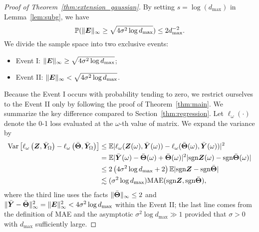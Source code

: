 \documentclass[11pt]{article}
\theoremstyle{plain}
\theoremstyle{definition}
\def\sign{\textup{sgn}}
\begin{document}
\begin{proof}[Proof of Theorem~\ref{thm:extension_gaussian}]
By setting $s=\log(d_{\max})$ in Lemma~\ref{lem:subg}, we have
\[
\mathbb{P}(\lVert\bm{E}\rVert_\infty\geq \sqrt{4\sigma^2\log d_{\max}} )\leq 2d_{\max}^{-2}.
\]
We divide the sample space into two exclusive events:
\begin{itemize}
\item Event I: $\lVert\bm{E}\rVert_\infty\geq \sqrt{4\sigma^2\log d_{\max}}$;
\item Event II: $\lVert\bm{E}\rVert_\infty< \sqrt{4\sigma^2\log d_{\max}}$.
\end{itemize}
Because the Event I occurs with probability tending to zero, we restrict ourselves to the Event II only by following the proof of Theorem~\ref{thm:main}.   We summarize the key difference compared to Section~\ref{thm:regression}. Let $\ell_\omega(\cdot)$ denote the 0-1 loss evaluated at the $\omega$-th value of matrix. 
We expand the variance by 
\begin{align}
    \label{eq:variance2}
    \text{Var}\left[\ell_\omega\left(\mZ,\bar \mY_\Omega\right)-\ell_\omega\left(\bar\mTheta,\bar\mY_\Omega\right)\right]&\leq \mathbb{E}|\ell_\omega(\mZ(\omega),\bar\mY(\omega))-\ell_\omega(\bar\mTheta(\omega),\bar\mY(\omega))|^2\notag \\
    &= \mathbb{E}|\bar \mY(\omega)-\bar \mTheta(\omega)+\bar\mTheta(\omega)|^2|\text{sgn}\mZ(\omega)-\text{sgn}\bar\mTheta(\omega)| \notag \\
    &\leq 2\left(4 \sigma^2\log d_{\max}+2\right) \mathbb{E}|\text{sgn}\mZ-\text{sgn}\bar\mTheta| \notag \\
    & \lesssim (\sigma^2 \log d_{\max}) \text{MAE}(\sign \mZ, \sign \bar \mTheta),
    \end{align}
where the third line uses the facts $\lVert\bar {\bm{\Theta}}\rVert_\infty\leq 2$ and $\lVert\bar {\bm Y}-\bar {\bm{\Theta}}\rVert_\infty^2=\lVert\bm{E}\rVert_\infty^2<4 \sigma^2\log d_{\max}$ within the Event II; the last line comes from the definition of MAE and the asymptotic $\sigma^2\log d_{\max}\gg 1$ provided that $\sigma>0$ with $d_{\max}$ sufficiently large. 


\end{proof}
\end{document}
